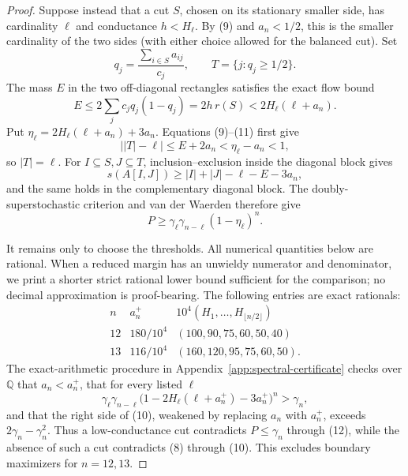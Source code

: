 \documentclass[10pt,a4paper]{amsart}
\theoremstyle{definition}
\theoremstyle{remark}
\newenvironment{exacttable}
  {\begingroup\small
   \setlength{\arraycolsep}{4pt}%
   \renewcommand{\arraystretch}{1.12}}
  {\endgroup}
\begin{document}
\begin{proof}
Suppose instead that a cut \(S\), chosen on its stationary smaller side,
has cardinality \(\ell\) and conductance \(h<H_\ell\). By (9) and
\(a_n<1/2\), this is the smaller cardinality of the two sides (with either
choice allowed for the balanced cut). Set
\[
 q_j=\frac{\sum_{i\in S}a_{ij}}{c_j},\qquad
 T=\{j:q_j\geq1/2\}.
\]
The mass \(E\) in the two off-diagonal rectangles satisfies the exact flow
bound
\[
 E\leq2\sum_jc_jq_j(1-q_j)=2h\,r(S)
   <2H_\ell(\ell+a_n).                              \tag{11}
\]
Put \(\eta_\ell=2H_\ell(\ell+a_n)+3a_n\). Equations (9)--(11) first give
\[
 \bigl||T|-\ell\bigr|\leq E+2a_n<\eta_\ell-a_n<1,
\]
so \(|T|=\ell\). For \(I\subseteq S,J\subseteq T\),
inclusion--exclusion inside the diagonal block gives
\[
s(A[I,J])\geq |I|+|J|-\ell-E-3a_n,
\]
and the same holds in the complementary diagonal block. The
doubly-superstochastic criterion and van der Waerden therefore give
\[
 P\geq\gamma_\ell\gamma_{n-\ell}(1-\eta_\ell)^n.    \tag{12}
\]

It remains only to choose the thresholds. All numerical quantities below are
rational. When a reduced margin has an unwieldy numerator and denominator, we
print a shorter strict rational lower bound sufficient for the comparison;
no decimal approximation is proof-bearing. The following entries are exact
rationals:
\begin{exacttable}
\[
\begin{array}{c|c|c}
n&a_n^+&10^4(H_1,\ldots,H_{\lfloor n/2\rfloor})\\ \hline
12&180/10^4&(100,90,75,60,50,40)\\
13&116/10^4&(160,120,95,75,60,50).
\end{array}
\]
\end{exacttable}
The exact-arithmetic procedure in
Appendix~\ref{app:spectral-certificate}
checks over \(\mathbb Q\) that \(a_n<a_n^+\), that for every listed
\(\ell\)
\[
\gamma_\ell\gamma_{n-\ell}
\bigl(1-2H_\ell(\ell+a_n^+)-3a_n^+\bigr)^n>\gamma_n,
\]
and that the right side of (10), weakened by replacing \(a_n\) with
\(a_n^+\), exceeds \(2\gamma_n-\gamma_n^2\). Thus a low-conductance cut
contradicts \(P\leq\gamma_n\) through (12), while the absence of such a cut
contradicts (8) through (10). This excludes boundary maximizers for
\(n=12,13\).


\end{proof}
\end{document}
